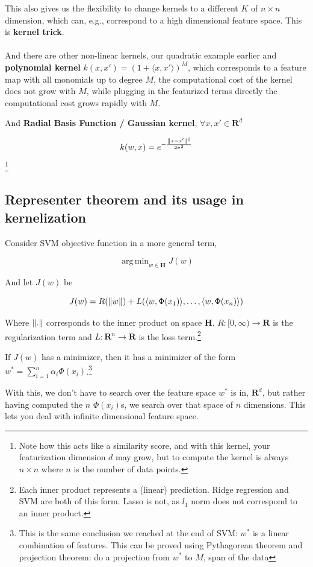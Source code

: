 \documentclass{article}
\DeclareMathOperator*{\argmin}{arg\,min}
\begin{document}
This also gives us the flexibility to change kernels to a different $K$ of $n \times n$ dimension, which can, e.g., correspond to a high dimensional feature space.
This is \textbf{kernel trick}.
\\
\\
And there are other non-linear kernels, our quadratic example earlier and \textbf{polynomial kernel} $k(x, x') = (1 + \langle x, x' \rangle)^M$, which corresponds to a feature map with all monomials up to degree $M$, the computational cost of the kernel does not grow with $M$, while plugging in the featurized terms directly the computational cost grows rapidly with $M$.

And \textbf{Radial Basis Function / Gaussian kernel}, $\forall x, x' \in \mathbf{R}^d$

$$
k(w, x) = e^{- \frac{\norm{x - x'}^2}{2 \sigma^2}}
$$\footnote{Note how this acts like a similarity score, and with this kernel, your featurization dimension $d$ may grow, but to compute the kernel is always $n \times n$ where $n$ is the number of data points.}


\subsection{Representer theorem and its usage in kernelization}

Consider SVM objective function in a more general term,

$$
\argmin_{w \in \mathbf{H}}{J(w)}
$$

And let $J(w)$ be

$$
J(w) = R(\norm{w}) + L(\langle w , \Phi(x_1) \rangle , \dots , \langle w , \Phi(x_n) \rangle)
$$

Where $\norm{.}$ corresponds to the inner product on space $\mathbf{H}$.
$R : [0, \infty) \to \mathbf{R}$ is the regularization term and $L : \mathbf{R}^n \to \mathbf{R}$ is the loss term.\footnote{Each inner product represents a (linear) prediction. Ridge regression and SVM are both of this form. Lasso is not, as $l_1$ norm does not correspond to an inner product.}

If $J(w)$ has a minimizer, then it has a minimizer of the form $w^* = \sum_{i = 1}^{n}{\alpha_i \Phi(x_i)}$.\footnote{This is the same conclusion we reached at the end of SVM: $w^*$ is a linear combination of features. This can be proved using Pythagorean theorem and projection theorem: do a projection from $w^*$ to $M$, span of the data}

With this, we don't have to search over the feature space $w^*$ is in, $\mathbf{R}^d$, but rather having computed the $n$ $\Phi(x_i)$s, we search over that space of $n$ dimensions.
This lets you deal with infinite dimensional feature space.
\end{document}
